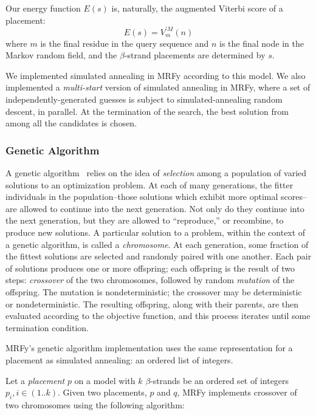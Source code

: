 \documentclass[blockstyle,times,preprint]{sigplanconf}
\begin{document}
Our energy function $E(s)$ is, naturally, the augmented Viterbi score of a
placement:
\begin{equation*}
  E(s) = V_{m}^{\prime M}(n)
\end{equation*}
where $m$ is the final residue in the query sequence and $n$ is the final
node in the Markov random field, and the $\beta$-strand placements are 
determined by $s$.

We implemented simulated annealing in MRFy according to this model.
We also implemented a \emph{multi-start} version of simulated annealing in MRFy,
where a set of independently-generated guesses is subject to simulated-annealing
random descent, in parallel.
At the termination of the search, the best solution from among all the 
candidates is chosen.


\subsubsection{Genetic Algorithm}

A genetic algorithm~\cite{Holland:1977hl} relies on the idea of 
\emph{selection} among a population of
varied solutions to an optimization problem.
At each of many generations, the fitter individuals in the population--those
solutions which exhibit more optimal scores--are allowed to continue into the
next generation.
Not only do they continue into the next generation, but they are allowed to
``reproduce,'' or recombine, to produce new solutions.
A particular solution to a problem, within the context of a genetic algorithm,
is called a \emph{chromosome}.
At each generation, some fraction of the fittest solutions are selected and
randomly paired with one another.
Each pair of solutions produces one or more offspring; each offspring is the
result of two steps: \emph{crossover} of the two chromosomes, followed by
random \emph{mutation} of the offspring.
The mutation is nondeterministic; the crossover may be deterministic or
nondeterministic.
The resulting offspring, along with their parents, are then evaluated according
to the objective function, and this process iterates until some termination
condition.


MRFy's genetic algorithm implementation uses the same representation for a
placement as simulated annealing: an ordered list of integers.

Let a \emph{placement} $p$ on a model with $k$ $\beta$-strands be an ordered 
set of integers $p_{i}, i \in (1..k)$.
Given two placements, $p$ and $q$, MRFy implements crossover of two chromosomes 
using the following algorithm:
\end{document}

